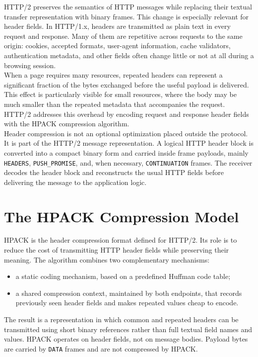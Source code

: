 \documentclass{scrbook}
\begin{document}
HTTP/2 preserves the semantics of HTTP messages while replacing their textual transfer representation with binary frames. This change is especially relevant for header fields. In HTTP/1.x, headers are transmitted as plain text in every request and response. Many of them are repetitive across requests to the same origin: cookies, accepted formats, user-agent information, cache validators, authentication metadata, and other fields often change little or not at all during a browsing session.\\

When a page requires many resources, repeated headers can represent a significant fraction of the bytes exchanged before the useful payload is delivered. This effect is particularly visible for small resources, where the body may be much smaller than the repeated metadata that accompanies the request. HTTP/2 addresses this overhead by encoding request and response header fields with the HPACK compression algorithm.\\

Header compression is not an optional optimization placed outside the protocol. It is part of the HTTP/2 message representation. A logical HTTP header block is converted into a compact binary form and carried inside frame payloads, mainly \texttt{HEADERS}, \texttt{PUSH\_PROMISE}, and, when necessary, \texttt{CONTINUATION} frames. The receiver decodes the header block and reconstructs the usual HTTP fields before delivering the message to the application logic.

\section{The HPACK Compression Model}

HPACK is the header compression format defined for HTTP/2. Its role is to reduce the cost of transmitting HTTP header fields while preserving their meaning. The algorithm combines two complementary mechanisms:

\begin{itemize}
    \item a static coding mechanism, based on a predefined Huffman code table;
    \item a shared compression context, maintained by both endpoints, that records previously seen header fields and makes repeated values cheap to encode.
\end{itemize}

The result is a representation in which common and repeated headers can be transmitted using short binary references rather than full textual field names and values. HPACK operates on header fields, not on message bodies. Payload bytes are carried by \texttt{DATA} frames and are not compressed by HPACK.
\end{document}
